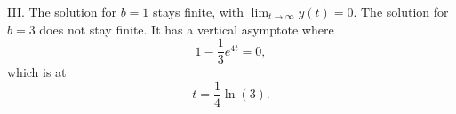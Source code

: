 \documentclass[]{ximera}
\begin{document}
\begin{problem}
\begin{solution}
III. The solution for $b=1$ stays finite, with $\lim_{t\rightarrow \infty} y(t) = 0$. The solution for $b=3$ does not stay finite. It has a vertical asymptote where
$$
1-\frac{1}{3} e^{4t} = 0,
$$
which is at 
$$
t= \frac{1}{4} \ln (3).
$$
\end{solution}
\end{problem}
\end{document}
